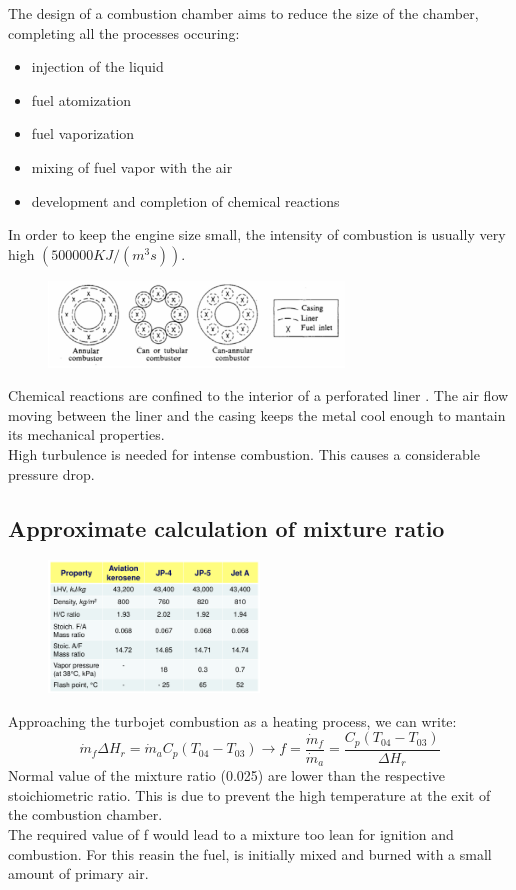 \documentclass[12pt]{article}
\begin{document}
The design of a combustion chamber aims to reduce the size of the chamber, completing all the processes occuring:
\begin{itemize}
    \item injection of the liquid
    \item fuel atomization
    \item fuel vaporization
    \item mixing of fuel vapor with the air
    \item development and completion of chemical reactions
\end{itemize}
 In order to keep the engine size small, the intensity of combustion is usually very high $(500000 KJ/(m^{3}s))$.

\begin{figure}[h!]
\centering
\includegraphics[width=0.7\textwidth]{figures/gaschamber.png}
\end{figure}

Chemical reactions are confined to the interior of a perforated liner . The air flow moving between the liner and the casing keeps the metal cool enough to mantain its mechanical properties.\\
High turbulence is needed for intense combustion. This causes a considerable pressure drop.

\subsection{Approximate calculation of mixture ratio}

\begin{figure}[h!]
\centering
\includegraphics[width=0.5\textwidth]{figures/mixturetable.png}
\end{figure}

Approaching the turbojet combustion as a heating process, we can write:
\begin{equation}
    \dot{m}_{f}\Delta H_{r} = \dot{m}_{a}C_{p}(T_{04}-T_{03}) \rightarrow f = \frac{\dot{m}_{f}}{\dot{m}_{a}} = \frac{C_{p}(T_{04}-T_{03})}{\Delta H_{r}}
\end{equation}
Normal value of the mixture ratio (0.025) are lower than the respective stoichiometric ratio. This is due to prevent the high temperature at the exit of the combustion chamber.\\
The required value of f would lead to a mixture too lean for ignition and combustion. For this reasin the fuel, is initially mixed and burned with a small amount of primary air.
\end{document}
